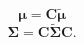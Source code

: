 \documentclass[11pt,]{article}
\begin{document}
\begin{appendices}
\begin{enumerate}
$$\boldsymbol{\mu} = \boldsymbol{C}\tilde{\boldsymbol{\mu}}$$
$$\boldsymbol{\Sigma} = \boldsymbol{C}\tilde{\boldsymbol{\Sigma}}\boldsymbol{C}.$$

\end{enumerate}

\end{appendices}
\end{document}
